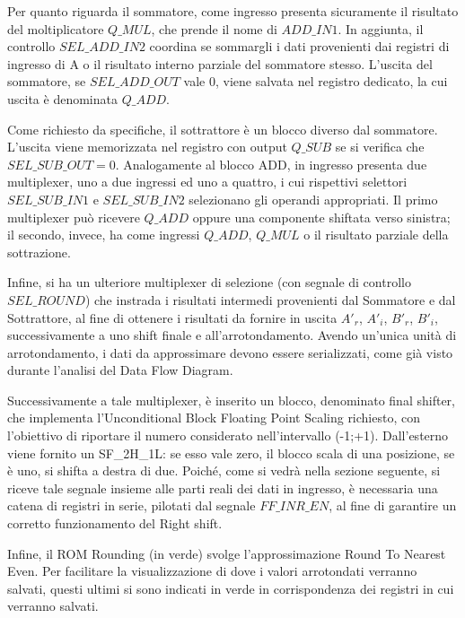 \noindent  Per quanto riguarda il sommatore, come ingresso presenta sicuramente il risultato del moltiplicatore $Q\_MUL$, che prende il nome di $ADD\_IN1$. In aggiunta, il controllo $SEL\_ADD\_IN2$ coordina se sommargli i dati provenienti dai registri di ingresso di A o il risultato interno parziale del sommatore stesso. L'uscita del sommatore, se $SEL\_ADD\_OUT$ vale 0, viene salvata nel registro dedicato, la cui uscita è denominata $Q\_ADD$.
    
\noindent  Come richiesto da specifiche, il sottrattore è un blocco diverso dal sommatore. L'uscita viene memorizzata nel registro con output $Q\_SUB$ se si verifica che $SEL\_SUB\_OUT = 0$. Analogamente al blocco ADD, in ingresso presenta due multiplexer, uno a due ingressi ed uno a quattro, i cui rispettivi selettori $SEL\_SUB\_IN1$ e $SEL\_SUB\_IN2$ selezionano gli operandi appropriati. Il primo multiplexer può ricevere $Q\_ADD$ oppure una componente shiftata verso sinistra; il secondo, invece, ha come ingressi $Q\_ADD$, $Q\_MUL$ o il risultato parziale della sottrazione.


\noindent Infine, si ha un ulteriore multiplexer di selezione (con segnale di controllo $SEL\_ROUND$) che instrada i risultati intermedi provenienti dal Sommatore e dal Sottrattore, al fine di ottenere i risultati da fornire in uscita $A'_{r}$, $A'_{i}$, $B'_{r}$, $B'_{i}$, successivamente a uno shift finale e all'arrotondamento. Avendo un'unica unità di arrotondamento, i dati da approssimare devono essere serializzati, come già visto durante l'analisi del Data Flow Diagram.

\noindent Successivamente a tale multiplexer, è inserito un blocco, denominato final shifter, che implementa l'Unconditional Block Floating Point Scaling richiesto, con l'obiettivo di riportare il numero considerato nell'intervallo (-1;+1). Dall'esterno viene fornito un SF\_2H\_1L: se esso vale zero, il blocco scala di una posizione, se è uno, si shifta a destra di due. Poiché, come si vedrà nella sezione seguente, si riceve tale segnale insieme alle parti reali dei dati in ingresso, è necessaria una catena di registri in serie, pilotati dal segnale $FF\_INR\_EN$, al fine di garantire un corretto funzionamento del Right shift.

\noindent Infine, il ROM Rounding (in verde) svolge l'approssimazione Round To Nearest Even. Per facilitare la visualizzazione di dove i valori arrotondati verranno salvati, questi ultimi si sono indicati in verde in corrispondenza dei registri in cui verranno salvati.

